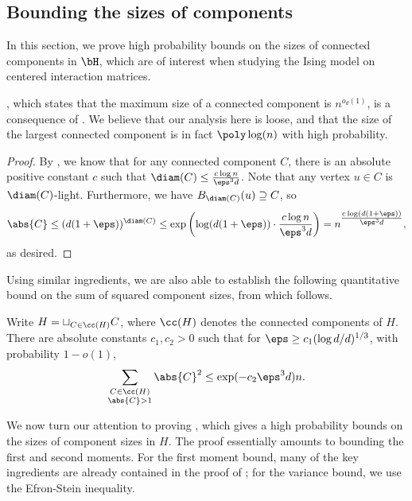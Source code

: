 \documentclass[11pt,letterpaper]{article}
\begin{document}
\subsection{Bounding the sizes of components}\label{sec:components-bound}
In this section, we prove high probability bounds on the sizes of connected components in $\bH$, which are of interest when studying the Ising model on  centered interaction matrices.

, which states that the maximum size of a connected component is $n^{o_d(1)}$, is a consequence of . 
\singlecomp*
We believe that our analysis here is loose, and that the size of the largest connected component is in fact $\poly\log(n)$ with high probability.
\begin{proof}
    By , we know that for any connected component $C$, there is an absolute positive constant $c$ such that $\diam(C) \le \frac{c\log n}{\eps^3 d}$. 
    Note that any vertex $u \in C$ is $\diam(C)$-light. 
    Furthermore, we have $B_{\diam(C)}(u) \supseteq C$, so 
    \[
        \abs{C} \le (d(1+\eps))^{\diam(C)} \le \exp\left(\log(d(1+\eps)) \cdot \frac{c\log n}{\eps^3 d}\right) = n^{\tfrac{c\log(d(1+\eps))}{\eps^3 d}},
    \]
    as desired.
\end{proof}

Using similar ingredients, we are also able to establish the following quantitative bound on the sum of squared component sizes, from which  follows.
\begin{lemma}\label{lem:component-size-precise}
    Write $H = \sqcup_{C \in \cc(H)} C$, where $\cc(H)$ denotes the connected components of $H$. 
    There are absolute constants $c_1, c_2 > 0$ such that for $\eps \ge c_1(\log d/d)^{1/3}$, with probability $1-o(1)$, 
    \[
        \sum_{\substack{C \in \cc(H) \\ \abs{C} > 1}} \abs{C}^2 \le \exp(-c_2 \eps^3 d)n.
    \]
\end{lemma}

We now turn our attention to proving , which gives a high probability bounds on the sizes of component sizes in $H$. 
The proof essentially amounts to bounding the first and second moments. 
For the first moment bound, many of the key ingredients are already contained in the proof of ; for the variance bound, we use the Efron-Stein inequality. 
\end{document}
